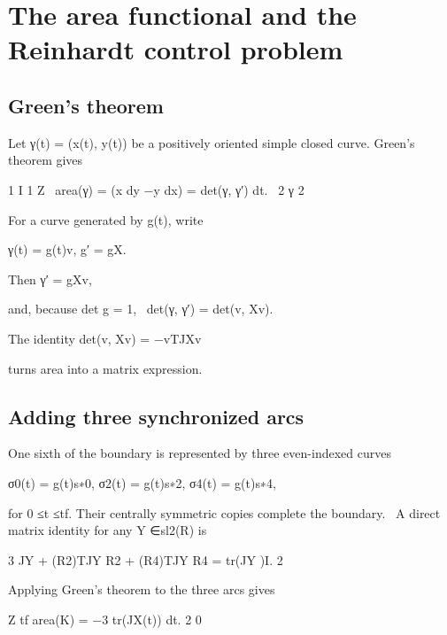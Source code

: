 \chapter{The area functional and the Reinhardt control problem}
\section{Green’s theorem}

Let γ(t) = (x(t), y(t)) be a positively oriented simple closed curve. Green’s theorem gives


\begin{displaytext}
1 I 1 Z \
area(γ) = (x dy −y dx) = det(γ, γ′) dt. \
2 γ 2
\end{displaytext}

For a curve generated by g(t), write


\begin{displaytext}
γ(t) = g(t)v, g′ = gX.
\end{displaytext}

Then γ′ = gXv,


\begin{displaytext}
and, because det g = 1, \
det(γ, γ′) = det(v, Xv).
\end{displaytext}

The identity det(v, Xv) = −vTJXv


turns area into a matrix expression.


\section{Adding three synchronized arcs}

One sixth of the boundary is represented by three even-indexed curves


\begin{displaytext}
σ0(t) = g(t)s∗0, σ2(t) = g(t)s∗2, σ4(t) = g(t)s∗4,
\end{displaytext}

\begin{displaytext}
for 0 ≤t ≤tf. Their centrally symmetric copies complete the boundary. \
A direct matrix identity for any Y ∈sl2(R) is
\end{displaytext}

3 JY + (R2)TJY R2 + (R4)TJY R4 = tr(JY )I. 2


Applying Green’s theorem to the three arcs gives


Z tf area(K) = −3 tr(JX(t)) dt. 2 0


